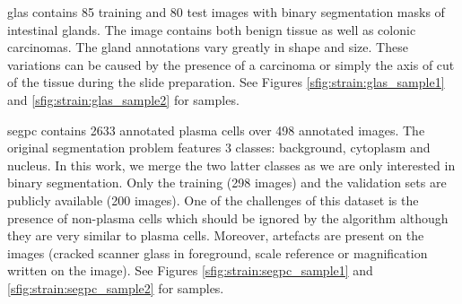 \acrshort{glas} \parencite{sirinukunwattana2017gland} contains 85 training and 80 test images with binary segmentation masks of intestinal glands. The image contains both benign tissue as well as colonic carcinomas. The gland annotations vary greatly in shape and size. These variations can be caused by the presence of a carcinoma or simply the axis of cut of the tissue during the slide preparation. See Figures \ref{sfig:strain:glas_sample1} and 
\ref{sfig:strain:glas_sample2} for samples.  

\acrshort{segpc} \parencite{gupta2021segpc} contains 2633 annotated plasma cells over 498 annotated images. The original segmentation problem features 3 classes: background, cytoplasm and nucleus. In this work, we merge the two latter classes as we are only interested in binary segmentation. Only the training (298 images) and the validation sets are publicly available (200 images). One of the challenges of this dataset is the presence of non-plasma cells which should be ignored by the algorithm although they are very similar to plasma cells. Moreover, artefacts are present on the images (\eg cracked scanner glass in foreground, scale reference or magnification written on the image). See Figures \ref{sfig:strain:segpc_sample1} and \ref{sfig:strain:segpc_sample2} for samples.

